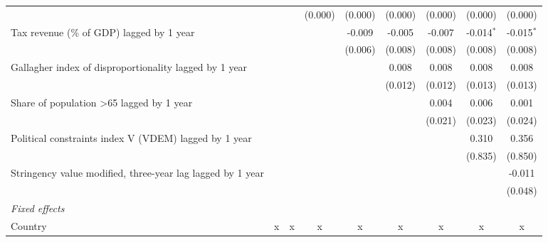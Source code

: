 \begin{tabular}{lcccccccc}
                                                              &               &               & (0.000)       & (0.000)       & (0.000)       & (0.000)       & (0.000)       & (0.000)\\   
   Tax revenue (\% of GDP) lagged by 1 year                   &               &               &               & -0.009        & -0.005        & -0.007        & -0.014$^{*}$  & -0.015$^{*}$\\   
                                                              &               &               &               & (0.006)       & (0.008)       & (0.008)       & (0.008)       & (0.008)\\   
   Gallagher index of disproportionality lagged by 1 year     &               &               &               &               & 0.008         & 0.008         & 0.008         & 0.008\\   
                                                              &               &               &               &               & (0.012)       & (0.012)       & (0.013)       & (0.013)\\   
   Share of population >65 lagged by 1 year                   &               &               &               &               &               & 0.004         & 0.006         & 0.001\\   
                                                              &               &               &               &               &               & (0.021)       & (0.023)       & (0.024)\\   
   Political constraints index V (VDEM) lagged by 1 year      &               &               &               &               &               &               & 0.310         & 0.356\\   
                                                              &               &               &               &               &               &               & (0.835)       & (0.850)\\   
   Stringency value modified, three-year lag lagged by 1 year &               &               &               &               &               &               &               & -0.011\\   
                                                              &               &               &               &               &               &               &               & (0.048)\\   
   \emph{Fixed effects}\\
   Country                                                    & x             & x             & x             & x             & x             & x             & x             & x\\  

\end{tabular}
